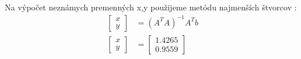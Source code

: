 \documentclass[../main.tex]{subfiles}
\begin{document}
Na výpočet neznámych premenných x,y použijeme metódu najmenších štvorcov :
\begin{equation}
	\begin{split}
	\begin{bmatrix}x \\y \end{bmatrix} &=  (A^TA)^{-1}A^Tb\\
	\begin{bmatrix}x \\y \end{bmatrix} &=  \begin{bmatrix} 1.4265 \\0.9559\end{bmatrix}
	\end{split}
	\label{eqn:MNS}
\end{equation}

		
\end{document}
